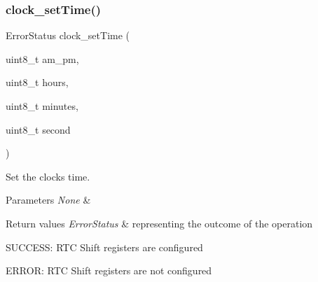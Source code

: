 \subsubsection{\texorpdfstring{clock\+\_\+set\+Time()}{clock\_setTime()}}
{\footnotesize\ttfamily Error\+Status clock\+\_\+set\+Time (\begin{DoxyParamCaption}\item[{uint8\+\_\+t}]{am\+\_\+pm,  }\item[{uint8\+\_\+t}]{hours,  }\item[{uint8\+\_\+t}]{minutes,  }\item[{uint8\+\_\+t}]{second }\end{DoxyParamCaption})}



Set the clock\textquotesingle{}s time. 


\begin{DoxyParams}{Parameters}
{\em None} & \\
\hline
\end{DoxyParams}

\begin{DoxyRetVals}{Return values}
{\em Error\+Status} & representing the outcome of the operation
\begin{DoxyItemize}
\item S\+U\+C\+C\+E\+SS\+: R\+TC Shift registers are configured
\item E\+R\+R\+OR\+: R\+TC Shift registers are not configured 
\end{DoxyItemize}\\
\hline
\end{DoxyRetVals}
